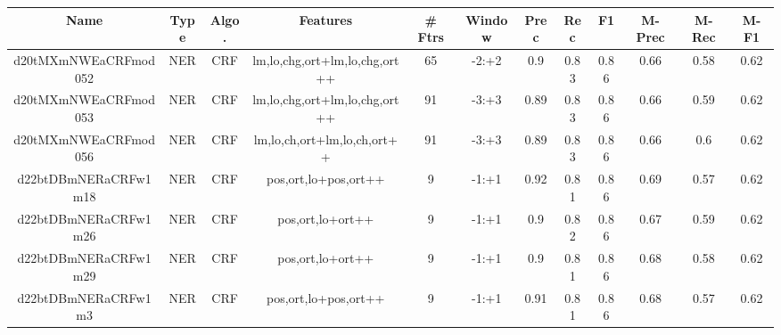 \documentclass[a4paper]{article}
\begin{document}
\begin{landscape}
\begin{center}
\begin{tabular}{ |c|c|c|c|c|c|c|c|c|c|c|c|} 
 \hline
 	Name & Type & Algo. & Features & \# Ftrs & Window & Prec & Rec & F1 & M-Prec & M-Rec & M-F1\\
 \hline

 		

 	
 
 	
 		
 		\small{ d20tMXmNWEaCRFmod052 } & NER & CRF & lm,lo,chg,ort+lm,lo,chg,ort++  &  65 &  -2:+2  &  0.9 & 0.83 & 0.86  &  0.66 & 0.58 & 0.62 \\
 		

 	
 
 	
 		
 		\small{ d20tMXmNWEaCRFmod053 } & NER & CRF & lm,lo,chg,ort+lm,lo,chg,ort++  &  91 &  -3:+3  &  0.89 & 0.83 & 0.86  &  0.66 & 0.59 & 0.62 \\
 		

 	
 
 	
 		
 		\small{ d20tMXmNWEaCRFmod056 } & NER & CRF & lm,lo,ch,ort+lm,lo,ch,ort++  &  91 &  -3:+3  &  0.89 & 0.83 & 0.86  &  0.66 & 0.6 & 0.62 \\
 		

 	
 
 	
 		
 		\small{ d22btDBmNERaCRFw1m18 } & NER & CRF & pos,ort,lo+pos,ort++  &  9 &  -1:+1  &  0.92 & 0.81 & 0.86  &  0.69 & 0.57 & 0.62 \\
 		

 	
 
 	
 		
 		\small{ d22btDBmNERaCRFw1m26 } & NER & CRF & pos,ort,lo+ort++  &  9 &  -1:+1  &  0.9 & 0.82 & 0.86  &  0.67 & 0.59 & 0.62 \\
 		

 	
 
 	
 		
 		\small{ d22btDBmNERaCRFw1m29 } & NER & CRF & pos,ort,lo+ort++  &  9 &  -1:+1  &  0.9 & 0.81 & 0.86  &  0.68 & 0.58 & 0.62 \\
 		

 	
 
 	
 		
 		\small{ d22btDBmNERaCRFw1m3 } & NER & CRF & pos,ort,lo+pos,ort++  &  9 &  -1:+1  &  0.91 & 0.81 & 0.86  &  0.68 & 0.57 & 0.62 \\
 		


\end{tabular}
\end{center}
\end{landscape}
\end{document}
